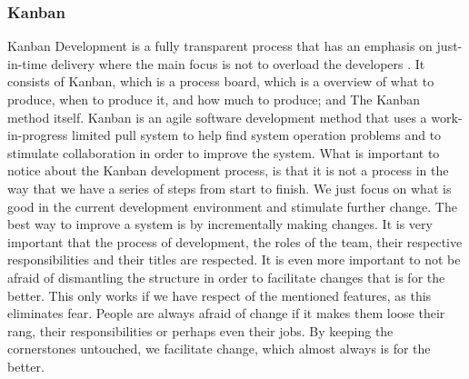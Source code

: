 \subsubsection{Kanban}
Kanban Development is a fully transparent process that has an emphasis on just-in-time delivery where the main focus is not to overload the developers \cite{bib:kanban}. It consists of Kanban, which is a process board, which is a overview of what to produce, when to produce it, and how much to produce; and The Kanban method itself.
\newline
\newline
Kanban is an agile software development method that uses a work-in-progress limited pull system to help find system operation problems and to stimulate collaboration in order to improve the system. What is important to notice about the Kanban development process, is that it is not a process in the way that we have a series of steps from start to finish. We just focus on what is good in the current development environment and stimulate further change. The best way to improve a system is by incrementally making changes.
\newline
\newline
It is very important that the process of development, the roles of the team, their respective responsibilities and their titles are respected. It is even more important to not be afraid of dismantling the structure in order to facilitate changes that is for the better. This only works if we have respect of the mentioned features, as this eliminates fear. People are always afraid of change if it makes them loose their rang, their responsibilities or perhaps even their jobs. By keeping the cornerstones untouched, we facilitate change, which almost always is for the better. 

